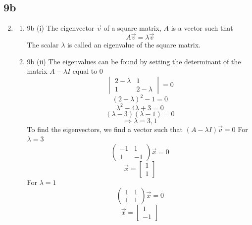 \documentclass[11pt]{article}
\newcommand{\solution}[1]{{{\color{blue}{\bf Solution:} {#1}}}}
\begin{document}
\subsection{9b}
\begin{enumerate}
\setcounter{enumi}{1}

\item
\begin{enumerate}
\item 9b (i) \newline
\solution{}
The eigenvector $\vec{v}$ of a square matrix, $A$ is a vector such that $$ A\vec{v} = \lambda \vec{v}$$
The scalar $\lambda$ is called an eigenvalue of the square matrix.

\item 9b (ii) \newline
\solution{}
The eigenvalues can be found by setting the determinant of the matrix $ A - \lambda I$ equal to 0
$$
\begin{vmatrix}
2 - \lambda & 1 \\
1 & 2 - \lambda
\end{vmatrix}
 = 0
$$
$$
(2 - \lambda)^2 - 1 = 0
$$
$$
\lambda ^ 2 - 4 \lambda + 3 = 0
$$
$$
(\lambda - 3)(\lambda - 1) = 0
$$
$$
\Rightarrow \lambda = 3, 1
$$
To find the eigenvectors, we find a vector such that $(A - \lambda I)\vec{v} = 0 $
\newline
For $\lambda = 3$
$$
\begin{pmatrix}
-1 & 1 \\
1 & -1 
\end{pmatrix}
\vec{x} = 0
$$
$$
\vec{x} = 
\begin{bmatrix}
1 \\
1
\end{bmatrix}
$$
\newline
For $\lambda = 1$
$$
\begin{pmatrix}
1 & 1 \\
1 & 1
\end{pmatrix}
\vec{x} = 0
$$
$$
\vec{x} = 
\begin{bmatrix}
1 \\
-1
\end{bmatrix}
$$


\end{enumerate}
\end{enumerate}
\end{document}
